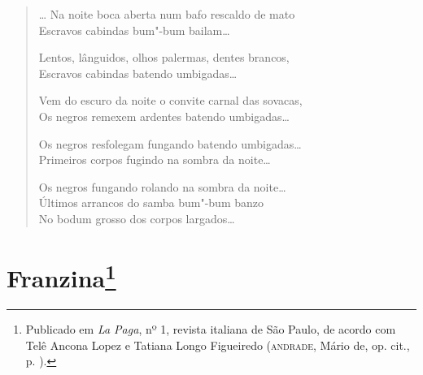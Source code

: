 \begin{verse}
\ldots{} Na noite boca aberta num bafo rescaldo de mato\\
Escravos cabindas bum"-bum bailam\ldots{}

Lentos, lânguidos, olhos palermas, dentes brancos,\\
Escravos cabindas batendo umbigadas\ldots{}

Vem do escuro da noite o convite carnal das sovacas,\\
Os negros remexem ardentes batendo umbigadas\ldots{}

Os negros resfolegam fungando batendo umbigadas\ldots{}\\
Primeiros corpos fugindo na sombra da noite\ldots{}

Os negros fungando rolando na sombra da noite\ldots{}\\
Últimos arrancos do samba bum"-bum banzo\\
No bodum grosso dos corpos largados\ldots{}
\end{verse}

\pagebreak
\section[Franzina]{Franzina\footnote[*]{Publicado em \emph{La Paga}, nº 1, revista
  italiana de São Paulo, de acordo com Telê Ancona Lopez e Tatiana Longo
  Figueiredo (\textsc{andrade}, Mário de, op. cit., p. ).}}


